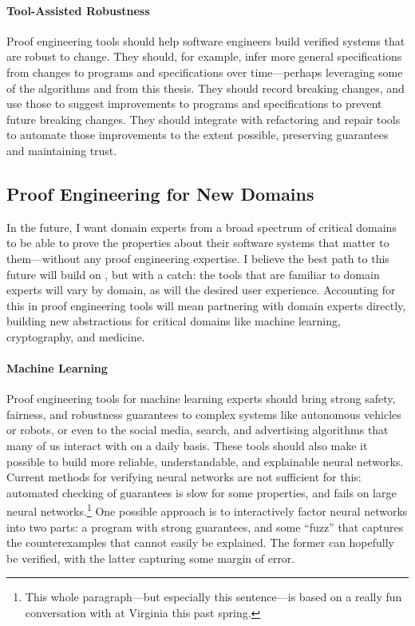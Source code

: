 \paragraph{Tool-Assisted Robustness}
Proof engineering tools should help software engineers build verified systems that are robust to change.
They should, for example, infer more general specifications from changes to programs and specifications over time---perhaps
leveraging some of the  algorithms and  from this thesis.
They should record breaking changes, and use those to suggest improvements to programs and specifications to prevent future breaking changes.
They should integrate with refactoring and repair tools to automate those improvements to the extent possible,
preserving guarantees and maintaining trust.

\subsection*{Proof Engineering for New Domains}

In the future, I want domain experts from a broad spectrum of critical domains to be able to prove the properties
about their software systems that matter to them---without any proof engineering expertise.
I believe the best path to this future will build on , but with a catch:
the tools that are familiar to domain experts will vary by domain, as will the desired user experience.
Accounting for this in proof engineering tools will mean partnering with domain experts directly,
building new abstractions for critical domains like machine learning, cryptography, and medicine.

\paragraph{Machine Learning}
Proof engineering tools for machine learning experts should bring strong safety, fairness, and robustness guarantees to
complex systems like autonomous vehicles or robots, or even to the social media, search, and advertising algorithms that many of us interact with
on a daily basis. These tools should also make it possible to build more reliable, understandable, and explainable neural networks.
Current methods for verifying neural networks are not sufficient for this: 
automated checking of guarantees is slow for some properties, and fails on large 
neural networks.\footnote{This whole paragraph---but especially this sentence---is based on a really fun conversation with  at Virginia this past spring.}
One possible approach is to interactively factor neural networks into two parts: a program with strong guarantees,
and some ``fuzz'' that captures the counterexamples that cannot easily be explained.
The former can hopefully be verified, with the latter capturing some margin of error.

